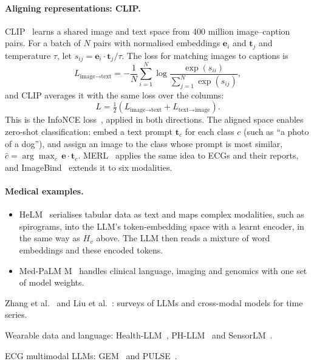 \paragraph{Aligning representations: CLIP.}
\label{sec:clip}
CLIP~\cite{radford2021learning} learns a shared image and text space from 400
million image--caption pairs. For a batch of $N$ pairs with normalised embeddings
$\mathbf{e}_i$ and $\mathbf{t}_j$ and temperature $\tau$, let
$s_{ij} = \mathbf{e}_i \cdot \mathbf{t}_j / \tau$. The loss for matching images to
captions is
\begin{equation}
  L_{\text{image}\to\text{text}} = -\frac{1}{N} \sum_{i=1}^{N}
    \log \frac{\exp(s_{ii})}{\sum_{j=1}^{N} \exp(s_{ij})},
\end{equation}
and CLIP averages it with the same loss over the columns:
\begin{equation}
  L = \tfrac{1}{2}\left(L_{\text{image}\to\text{text}} + L_{\text{text}\to\text{image}}\right).
\end{equation}
This is the InfoNCE loss~\cite{vandenoord2018representation}, applied in both
directions. The aligned space enables zero-shot classification: embed a text
prompt $\mathbf{t}_c$ for each class $c$ (such as ``a photo of a dog''), and assign
an image to the class whose prompt is most similar,
$\hat{c} = \arg\max_c \, \mathbf{e} \cdot \mathbf{t}_c$. MERL~\cite{liu2024zeroshot} applies
the same idea to ECGs and their reports, and ImageBind~\cite{girdhar2023imagebind}
extends it to six modalities.

\paragraph{Medical examples.}
\begin{itemize}
  \item HeLM~\cite{belyaeva2023multimodal} serialises tabular data as text and
        maps complex modalities, such as spirograms, into the LLM's
        token-embedding space with a learnt encoder, in the same way as $H_v$
        above. The LLM then reads a mixture of word embeddings and these
        encoded tokens.
  \item Med-PaLM M~\cite{tu2024towards} handles clinical language, imaging and
        genomics with one set of model weights.
\end{itemize}

\begin{furtherreading}
  \item Zhang et al.~\cite{zhang2024large} and Liu et al.~\cite{liu2025towards}:
        surveys of LLMs and cross-modal models for time series.
  \item Wearable data and language: Health-LLM~\cite{kim2024healthllm},
        PH-LLM~\cite{belyaeva2025personal} and SensorLM~\cite{zhang2025sensorlm}.
  \item ECG multimodal LLMs: GEM~\cite{lan2025gem} and PULSE~\cite{liu2024teach}.
\end{furtherreading}


